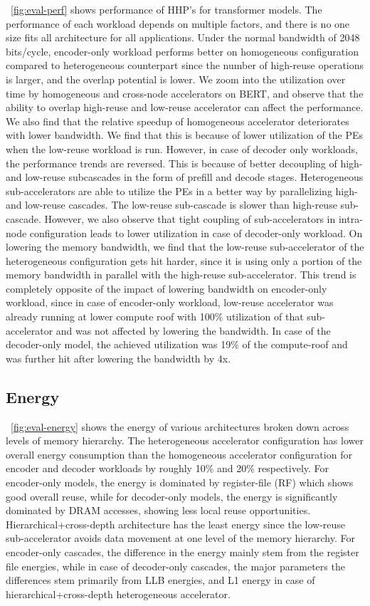 ~\autoref{fig:eval-perf} shows performance of HHP's for transformer models. The performance of each workload depends on multiple factors, and there is no one size fits all architecture for all applications. Under the normal bandwidth of 2048 bits/cycle, encoder-only workload performs better on homogeneous configuration compared to heterogeneous counterpart since the number of high-reuse operations is larger, and the overlap potential is lower. We zoom into the utilization over time by homogeneous and cross-node accelerators on BERT, and observe that the ability to overlap high-reuse and low-reuse accelerator can affect the performance. We also find that the relative speedup of homogeneous accelerator deteriorates with lower bandwidth. We find that this is because of lower utilization of the PEs when the low-reuse workload is run. However, in case of decoder only workloads, the performance trends are reversed. This is because of better decoupling of high- and low-reuse subcascades in the form of prefill and decode stages. Heterogeneous sub-accelerators are able to utilize the PEs in a better way by parallelizing high- and low-reuse cascades. The low-reuse sub-cascade is slower than high-reuse sub-cascade. However, we also observe that tight coupling of sub-accelerators in intra-node configuration leads to lower utilization in case of decoder-only workload. On lowering the memory bandwidth, we find that the low-reuse sub-accelerator of the heterogeneous configuration gets hit harder, since it is using only a portion of the memory bandwidth in parallel with the high-reuse sub-accelerator. This trend is completely opposite of the impact of lowering bandwidth on encoder-only workload, since in case of encoder-only workload, low-reuse accelerator was already running at lower compute roof with 100\% utilization of that sub-accelerator and was not affected by lowering the bandwidth. In case of the decoder-only model, the achieved utilization was 19\% of the compute-roof and was further hit after lowering the bandwidth by 4x. 

\subsection{Energy}

~\autoref{fig:eval-energy} shows the energy of various architectures broken down across levels of memory hierarchy. The heterogeneous accelerator configuration has lower overall energy consumption than the homogeneous accelerator configuration for encoder and decoder workloads by roughly 10\% and 20\% respectively. For encoder-only models, the energy is dominated by register-file (RF) which shows good overall reuse, while for decoder-only models, the energy is significantly dominated by DRAM accesses, showing less local reuse opportunities. Hierarchical+cross-depth architecture has the least energy since the low-reuse sub-accelerator avoids data movement at one level of the memory hierarchy. For encoder-only cascades, the difference in the energy mainly stem from the register file energies, while in case of decoder-only cascades, the major parameters the differences stem primarily from LLB energies, and L1 energy in case of hierarchical+cross-depth heterogeneous accelerator.

